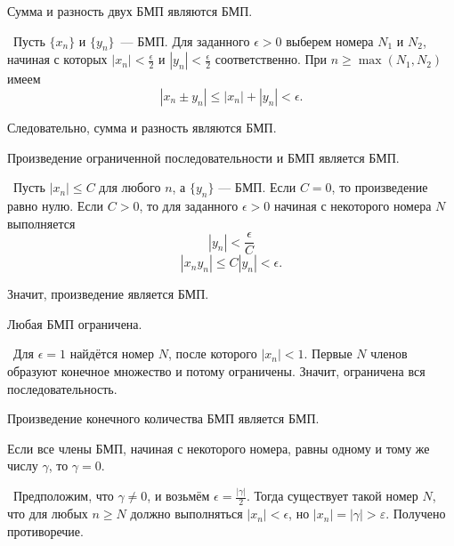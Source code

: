 \vspace{3mm}

\begin{theorem} \label{theorem_BMP_sumdiff}
Сумма и разность двух БМП являются БМП.

\vspace{2mm}

\proofname~Пусть \(\{x_{n}\}\) и \(\{y_{n}\}\)~--- БМП. Для заданного
\(\epsilon > 0\) выберем номера \(N_{1}\) и \(N_{2}\), начиная с
которых \(|x_{n}| < \frac{\epsilon}{2}\) и
\(|y_{n}| < \frac{\epsilon}{2}\) соответственно. При
\(n \geq \max(N_{1},N_{2})\) имеем
\[
|x_{n} \pm y_{n}| \leq |x_{n}| + |y_{n}| < \epsilon.
\]

Следовательно, сумма и разность являются БМП.~\qedsymbol
\end{theorem}

\begin{theorem} \label{theorem_BMP_product}
Произведение ограниченной последовательности и БМП является БМП.

\vspace{2mm}

\proofname~Пусть \(|x_{n}| \leq C\) для любого \(n\), а
\(\{y_{n}\}\) --- БМП. Если \(C = 0\), то произведение равно нулю.
Если \(C > 0\), то для заданного \(\epsilon > 0\) начиная с некоторого
номера \(N\) выполняется
\[
|y_{n}| < \frac{\epsilon}{C}
\]
\[
|x_{n}y_{n}| \leq C|y_{n}| < \epsilon.
\]

    Значит, произведение является БМП.~\qedsymbol
\end{theorem}

\begin{theorem}
Любая БМП ограничена.

\vspace{2mm}

\proofname~Для \(\epsilon = 1\) найдётся номер \(N\), после которого
\(|x_{n}| < 1\). Первые \(N\) членов образуют конечное множество и
потому ограничены. Значит, ограничена вся последовательность.~\qedsymbol
\end{theorem}

\begin{corollary}
Произведение конечного количества БМП является БМП.
\end{corollary}

\begin{theorem}
Если все члены БМП, начиная с некоторого номера, равны одному и тому же
числу \(\gamma\), то \(\gamma = 0\).

\vspace{2mm}

\proofname~Предположим, что \(\gamma \neq 0\), и возьмём
\(\epsilon = \frac{|\gamma|}{2}\). Тогда существует такой номер \(N\),
что для любых \(n \geq N\) должно выполняться \(|x_{n}| < \epsilon\), но
\(|x_{n}|=|\gamma|>\varepsilon\). Получено противоречие.~\qedsymbol
\end{theorem}

